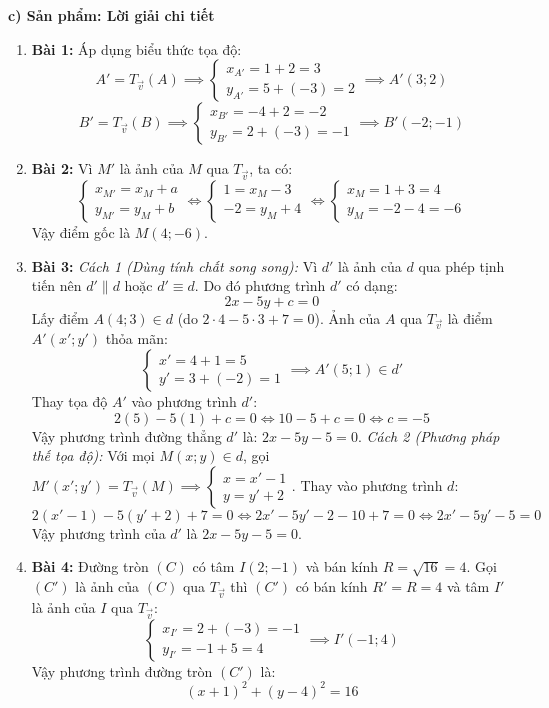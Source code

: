 \documentclass[12pt, a4paper]{article}
\renewcommand{\vec}[1]{\overrightarrow{#1}}
\begin{document}
\noindent \textbf{c) Sản phẩm: Lời giải chi tiết}  
\begin{enumerate}[leftmargin=0.6cm]  
    \item \textbf{Bài 1:}  
    Áp dụng biểu thức tọa độ:  
    $$A' = T_{\vec{v}}(A) \implies \begin{cases} x_{A'} = 1 + 2 = 3 \\ y_{A'} = 5 + (-3) = 2 \end{cases} \implies A'(3; 2)$$  
    $$B' = T_{\vec{v}}(B) \implies \begin{cases} x_{B'} = -4 + 2 = -2 \\ y_{B'} = 2 + (-3) = -1 \end{cases} \implies B'(-2; -1)$$  
    \item \textbf{Bài 2:}  
    Vì $M'$ là ảnh của $M$ qua $T_{\vec{v}}$, ta có:  
    $$\begin{cases} x_{M'} = x_M + a \\ y_{M'} = y_M + b \end{cases} \iff \begin{cases} 1 = x_M - 3 \\ -2 = y_M + 4 \end{cases} \iff \begin{cases} x_M = 1 + 3 = 4 \\ y_M = -2 - 4 = -6 \end{cases}$$  
    Vậy điểm gốc là $M(4; -6)$.  
    \item \textbf{Bài 3:}  
    \textit{Cách 1 (Dùng tính chất song song):}  
    Vì $d'$ là ảnh của $d$ qua phép tịnh tiến nên $d' \parallel d$ hoặc $d' \equiv d$. Do đó phương trình $d'$ có dạng:  
    $$2x - 5y + c = 0$$  
    Lấy điểm $A(4; 3) \in d$ (do $2 \cdot 4 - 5 \cdot 3 + 7 = 0$).  
    Ảnh của $A$ qua $T_{\vec{v}}$ là điểm $A'(x'; y')$ thỏa mãn:  
    $$\begin{cases} x' = 4 + 1 = 5 \\ y' = 3 + (-2) = 1 \end{cases} \implies A'(5; 1) \in d'$$  
    Thay tọa độ $A'$ vào phương trình $d'$:  
    $$2(5) - 5(1) + c = 0 \iff 10 - 5 + c = 0 \iff c = -5$$  
    Vậy phương trình đường thẳng $d'$ là: $2x - 5y - 5 = 0$.  
    \textit{Cách 2 (Phương pháp thế tọa độ):}  
    Với mọi $M(x; y) \in d$, gọi $M'(x'; y') = T_{\vec{v}}(M) \implies \begin{cases} x = x' - 1 \\ y = y' + 2 \end{cases}$.  
    Thay vào phương trình $d$:  
    $$2(x' - 1) - 5(y' + 2) + 7 = 0 \iff 2x' - 5y' - 2 - 10 + 7 = 0 \iff 2x' - 5y' - 5 = 0$$  
    Vậy phương trình của $d'$ là $2x - 5y - 5 = 0$.  
    \item \textbf{Bài 4:}  
    Đường tròn $(C)$ có tâm $I(2; -1)$ và bán kính $R = \sqrt{16} = 4$.  
    Gọi $(C')$ là ảnh của $(C)$ qua $T_{\vec{v}}$ thì $(C')$ có bán kính $R' = R = 4$ và tâm $I'$ là ảnh của $I$ qua $T_{\vec{v}}$:  
    $$\begin{cases} x_{I'} = 2 + (-3) = -1 \\ y_{I'} = -1 + 5 = 4 \end{cases} \implies I'(-1; 4)$$  
    Vậy phương trình đường tròn $(C')$ là:  
    $$(x + 1)^2 + (y - 4)^2 = 16$$  
\end{enumerate}  
  
\end{document}
